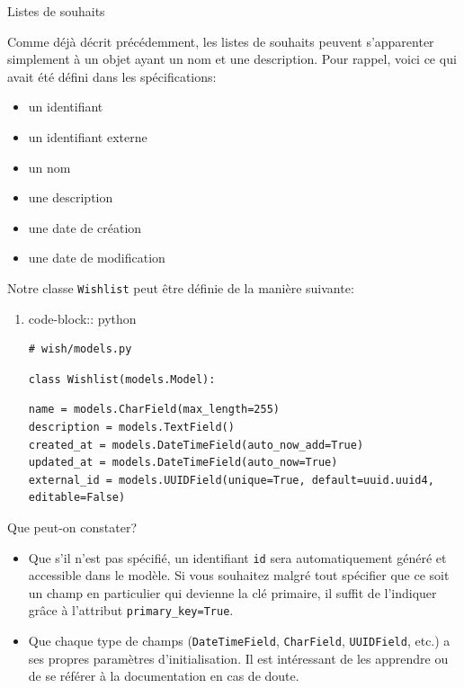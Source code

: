 \documentclass[11pt]{amsbook}
\newenvironment{sidebar}[1][r]
  {\wrapfigure{#1}{0.5\textwidth}\tcolorbox}
  {\endtcolorbox\endwrapfigure}
\begin{document}
\begin{sidebar}
Listes de souhaits
\end{sidebar}

Comme déjà décrit précédemment, les listes de souhaits peuvent s’apparenter simplement à un objet ayant un nom et une description. Pour rappel, voici ce qui avait été défini dans les spécifications:


\begin{itemize}

\item un identifiant

\item un identifiant externe

\item un nom

\item une description

\item une date de création

\item une date de modification

\end{itemize}


Notre classe \texttt{Wishlist} peut être définie de la manière suivante:


\begin{enumerate}

\item{code-block:: python}

\begin{verbatim}
# wish/models.py
\end{verbatim}

\begin{verbatim}
class Wishlist(models.Model):
\end{verbatim}

\begin{verbatim}
name = models.CharField(max_length=255)
description = models.TextField()
created_at = models.DateTimeField(auto_now_add=True)
updated_at = models.DateTimeField(auto_now=True)
external_id = models.UUIDField(unique=True, default=uuid.uuid4, editable=False)
\end{verbatim}
\end{enumerate}


Que peut-on constater?


\begin{itemize}

\item Que s’il n’est pas spécifié, un identifiant \texttt{id} sera automatiquement généré et accessible dans le modèle. Si vous souhaitez malgré tout spécifier que ce soit un champ en particulier qui devienne la clé primaire, il suffit de l’indiquer grâce à l’attribut \texttt{primary\_key=True}.

\item Que chaque type de champs (\texttt{DateTimeField}, \texttt{CharField}, \texttt{UUIDField}, etc.) a ses propres paramètres d’initialisation. Il est intéressant de les apprendre ou de se référer à la documentation en cas de doute.

\end{itemize}
\end{document}
